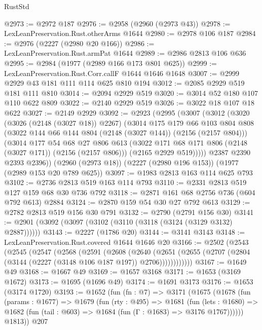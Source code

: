 \begin{lexlean}{RustStd}
\begin{coremodule}
@2973 := @2972 @187
@2976 := @2958 (@2960 (@2973 @43))
@2978 := LexLeanPreservation.Rust.otherArms @1644
@2980 := @2978 @106 @187
@2984 := @2976 (@2227 (@2980 @20 @166))
@2986 := LexLeanPreservation.Rust.armPat @1644
@2989 := @2986 @2813 @106 @636
@2995 := @2984 (@1977 (@2989 @166 @173 @801 @625))
@2999 := LexLeanPreservation.Rust.Corr.callF @1644 @1646 @1648
@3007 := @2999 @2929 @43 @181 @111 @114 @625 @810 @194
@3012 := @2085 @2929 @519 @181 @111 @810
@3014 := @2094 @2929 @519
@3020 := @3014 @52 @180 @107 @110 @622 @809
@3022 := @2140 @2929 @519
@3026 := @3022 @18 @107 @18 @622
@3027 := @2149 @2929
@3092 := @2923
    (@2995
      (@3007
        (@3012
          (@3020
            (@3026 (@2148 (@3027 @18)) @2267)
            (@3014
              @175
              @179
              @66
              @103
              @804
              @808
              (@3022 @144 @66 @144 @804 (@2148 (@3027 @144)) (@2156 (@2157 @804)))
              (@3014
                @177
                @54
                @68
                @27
                @806
                @613
                (@3022 @171 @68 @171 @806 (@2148 (@3027 @171)) (@2156 (@2157 @806)))
                (@2165 @2929 @519)))))
        @2387
        @2390
        @2393
        @2396))
    (@2960 (@2973 @18))
    (@2227 (@2980 @196 @153))
    (@1977 (@2989 @153 @20 @789 @625))
@3097 := @1983 @2813 @163 @114 @625 @793
@3102 := @2736 @2813 @519 @163 @114 @793
@3110 := @2331 @2813 @519 @127 @159 @68 @30 @736 @792
@3118 := @2871 @161 @68 @2756 @736 (@604 @792 @613) @2884
@3124 := @2870 @159 @54 @30 @27 @792 @613
@3129 := @2782 @2813 @519 @156 @30 @791
@3132 := @2790 (@2791 @156 @30)
@3141 := @2901 (@3092 (@3097 (@3102 (@3110 (@3118 (@3124 (@3129 @3132) @2887))))))
@3143 := @2227 (@1786 @20)
@3144 := @3141 @3143
@3148 := LexLeanPreservation.Rust.covered @1644 @1646 @20
@3166 := @2502
    (@2543
      (@2545
        (@2547
          (@2568
            (@2591
              (@2608
                (@2640
                  (@2651
                    (@2655 (@2707 (@2804 (@3144 (@2227 (@3148 @106 @187 @197)) @2706))))))))))))
@3167 := @1649 @49
@3168 := @1667 @49
@3169 := @1657 @3168
@3171 := @1653 (@3169 @1672)
@3173 := @1695 (@1696 @49)
@3174 := @1691 @3173
@3176 := @1653 (@3174 @1720)
@3193 := @1652
    (fun (fn : @7) =>
    @3171
      (@1675
        (@1678
          (fun (params : @1677) =>
          @1679
            (fun (rty : @495) =>
            @1681
              (fun (lets : @1680) =>
              @1682 (fun (tail : @603) => @1684 (fun (Γ : @1683) => @3176 @1767))))))
        @1813))
    @207

\end{coremodule}
\end{lexlean}
